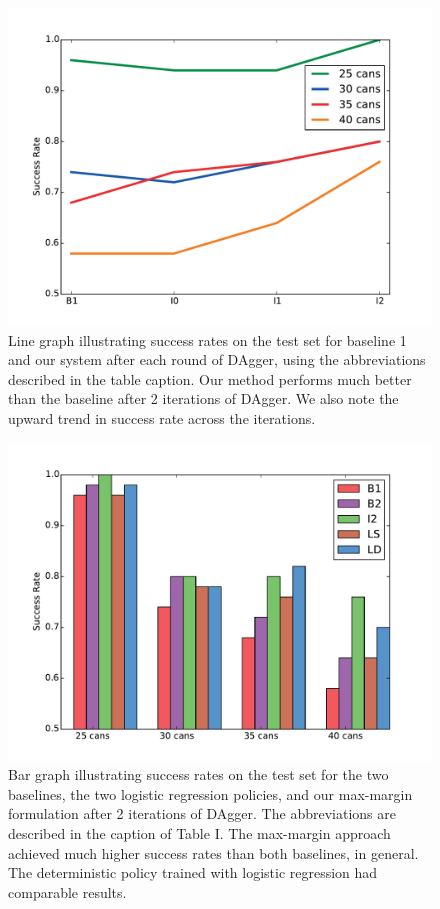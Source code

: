 \begin{figure}[h]
  \centering
    \includegraphics[scale=0.43]{images/results_line}
  \caption{\small{Line graph illustrating success rates on the test set for baseline 1
and our system after each round of DAgger, using the abbreviations described in the
table caption. Our method performs much better than the baseline after 2 iterations of DAgger.
We also note the upward trend in success rate across the iterations.}}
  \label{fig:results_line}
\end{figure}

\begin{figure}[h]
  \centering
    \includegraphics[scale=0.43]{images/results_bar_succ}
  \caption{\small{Bar graph illustrating success rates on the test set for the
two baselines, the two logistic regression policies, and our max-margin formulation after 2 iterations of DAgger. The abbreviations are described in the caption of Table I. The max-margin approach achieved much higher
success rates than both baselines, in general. The deterministic policy trained with logistic regression had comparable results.}}
  \label{fig:results_bar_succ}
\end{figure}

